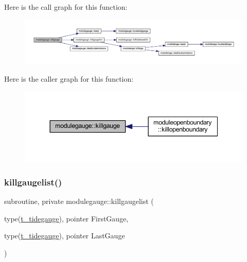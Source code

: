 Here is the call graph for this function\+:\nopagebreak
\begin{figure}[H]
\begin{center}
\leavevmode
\includegraphics[width=350pt]{namespacemodulegauge_a545694594f895a232c1f0b4fc8256bb9_cgraph}
\end{center}
\end{figure}
Here is the caller graph for this function\+:\nopagebreak
\begin{figure}[H]
\begin{center}
\leavevmode
\includegraphics[width=344pt]{namespacemodulegauge_a545694594f895a232c1f0b4fc8256bb9_icgraph}
\end{center}
\end{figure}
\mbox{\label{namespacemodulegauge_a773a918cd865d16ad9720682f4f76009}} 
\subsubsection{\texorpdfstring{killgaugelist()}{killgaugelist()}}
{\footnotesize\ttfamily subroutine, private modulegauge\+::killgaugelist (\begin{DoxyParamCaption}\item[{type(\mbox{\hyperlink{structmodulegauge_1_1t__tidegauge}{t\+\_\+tidegauge}}), pointer}]{First\+Gauge,  }\item[{type(\mbox{\hyperlink{structmodulegauge_1_1t__tidegauge}{t\+\_\+tidegauge}}), pointer}]{Last\+Gauge }\end{DoxyParamCaption})\hspace{0.3cm}{\ttfamily [private]}}

